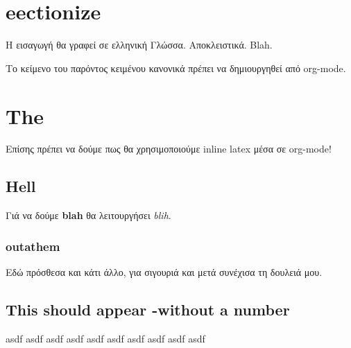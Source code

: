 \section{eectionize}
\label{sec:org27f5268}
Η εισαγωγή θα γραφεί σε ελληνική Γλώσσα. Αποκλειστικά. Blah.

Το κείμενο του παρόντος κειμένου κανονικά πρέπει να δημιουργηθεί από org-mode.
\section{The}
\label{sec:org03d8064}
Επίσης πρέπει να δούμε πως θα χρησιμοποιούμε inline latex μέσα σε org-mode!
\subsection{Hell}
\label{sec:orga0c5a2c}
Γιά να δούμε \textbf{blah} θα λειτουργήσει \emph{blih}.
\subsubsection{outathem}
\label{sec:orgb13cd50}
Εδώ πρόσθεσα και κάτι άλλο, για σιγουριά και μετά συνέχισα τη δουλειά μου.
\subsection{This should appear -without a number}
\label{sec:org868a4cb}

asdf asdf asdf asdf asdf asdf asdf asdf asdf asdf
